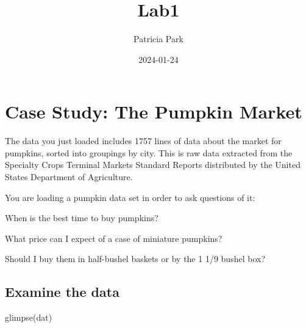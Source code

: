 \documentclass[
]{article}
\title{Lab1}
\author{Patricia Park}
\date{2024-01-24}
\newenvironment{Shaded}{\begin{snugshade}}{\end{snugshade}}
\newcommand{\FunctionTok}[1]{\textcolor[rgb]{0.00,0.00,0.00}{#1}}
\newcommand{\NormalTok}[1]{#1}
\begin{document}
\maketitle

\hypertarget{case-study-the-pumpkin-market}{%
\section{Case Study: The Pumpkin
Market}\label{case-study-the-pumpkin-market}}

The data you just loaded includes 1757 lines of data about the market
for pumpkins, sorted into groupings by city. This is raw data extracted
from the Specialty Crops Terminal Markets Standard Reports distributed
by the United States Department of Agriculture.

You are loading a pumpkin data set in order to ask questions of it:

When is the best time to buy pumpkins?

What price can I expect of a case of miniature pumpkins?

Should I buy them in half-bushel baskets or by the 1 1/9 bushel box?

\hypertarget{examine-the-data}{%
\subsection{Examine the data}\label{examine-the-data}}

\begin{Shaded}
\begin{Highlighting}[]
\FunctionTok{glimpse}\NormalTok{(dat)}
\end{Highlighting}
\end{Shaded}
\end{document}
